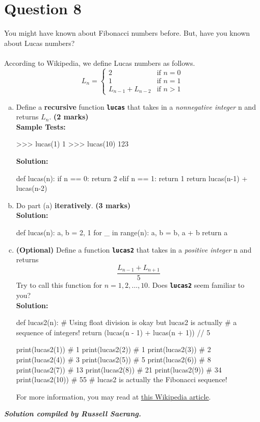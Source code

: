 \section{Question 8}
You might have known about Fibonacci numbers before. But, have you known about Lucas numbers? \\ \\
According to Wikipedia, we define Lucas numbers as follows.
\[
    L_n =
    \begin{cases}
        2 & \text{if } n = 0 \\
        1 & \text{if } n = 1 \\
        L_{n-1} + L_{n-2} & \text{if } n > 1
    \end{cases}
\]
\begin{enumerate}[(a)]
\item Define a \textbf{recursive} function \texttt{\bfseries lucas} that takes in a \textit{nonnegative integer} n and
returns $L_n$. \textbf{(2 marks)} \\
\textbf{Sample Tests:}
\begin{python}
>>> lucas(1)
1
>>> lucas(10)
123
\end{python}
\textbf{Solution:}
\begin{python}
def lucas(n):
    if n == 0:
        return 2
    elif n == 1:
        return 1
    return lucas(n-1) + lucas(n-2)
\end{python}

\item Do part (a) \textbf{iteratively}. \textbf{(3 marks)} \\
\textbf{Solution:}
\begin{python}
def lucas(n):
    a, b = 2, 1
    for _ in range(n):
        a, b = b, a + b
    return a
\end{python}

\item \textbf{(Optional)} Define a function \texttt{\bfseries lucas2} that takes in a \textit{positive integer} n and returns
\[\frac{L_{n-1}+L_{n+1}}{5}\]
Try to call this function for $n = 1, 2, \ldots, 10$. Does \texttt{\bfseries lucas2} seem familiar to you? \\
\textbf{Solution:}
\begin{python}
def lucas2(n):
    # Using float division is okay but lucas2 is actually
    # a sequence of integers!
    return (lucas(n - 1) + lucas(n + 1)) // 5

print(lucas2(1))    # 1
print(lucas2(2))    # 1
print(lucas2(3))    # 2
print(lucas2(4))    # 3
print(lucas2(5))    # 5
print(lucas2(6))    # 8
print(lucas2(7))    # 13
print(lucas2(8))    # 21
print(lucas2(9))    # 34
print(lucas2(10))   # 55
# lucas2 is actually the Fibonacci sequence!
\end{python}
For more information, you may read at \href{https://en.wikipedia.org/wiki/Lucas_number#Relationship_to_Fibonacci_numbers}{\underline{this Wikipedia article}}.
\end{enumerate}

\begin{flushright}
\vspace{2 cm}\textbf{\textit{Solution compiled by Russell Saerang.}}
\end{flushright}

